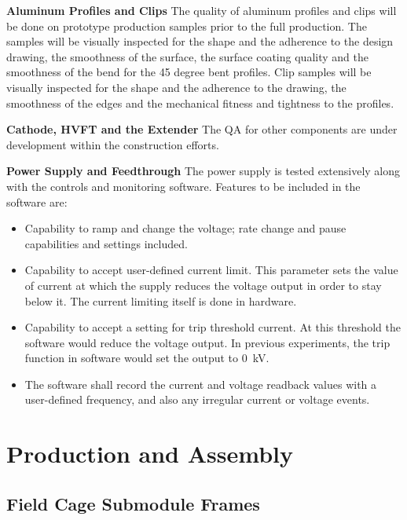 {\bf Aluminum Profiles and Clips}
The quality of aluminum profiles and clips will be done on prototype production samples prior to the full production.   The samples will be visually inspected for the shape and the adherence to the design drawing, the smoothness of the surface, the surface coating quality and the smoothness of the bend for the 45 degree bent profiles.  Clip samples will be visually inspected for the shape and the adherence to the drawing, the smoothness of the edges and the mechanical fitness and tightness to the profiles.


{\bf Cathode, HVFT and the Extender} The QA for other components are under development within the  construction efforts.


{\bf Power Supply and Feedthrough} The power supply is tested extensively along with the controls and monitoring software.  Features to be included in the software are:
\begin{itemize}
\item Capability to ramp and change the voltage; rate change and pause capabilities and settings included. 
\item Capability to accept user-defined current limit.  This parameter sets the value of current at which the supply reduces the voltage output in order to stay below it.  The current limiting itself is done in hardware.
\item Capability to accept a setting for trip threshold current.  At this threshold the software would reduce the voltage output. 
In previous experiments, the trip function in software would set the output to \SI{0}{kV}. 
\item The software shall record the current and voltage readback values with a user-defined frequency, and also any irregular current or voltage events. 
\end{itemize}


\section{Production and Assembly}
\label{sec:fddp-hv-prod-assy}

\subsection{Field Cage Submodule Frames}
\label{sec:fddp-hv-prod-assy-fc-frames}



